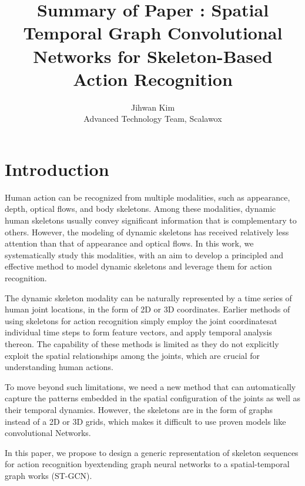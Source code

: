 \documentclass{article}
\begin{document}

\title{Summary of Paper : Spatial Temporal Graph Convolutional Networks for Skeleton-Based Action Recognition} %
\author{Jihwan Kim\\Advanced Technology Team, Scalawox} %

\maketitle

\section{Introduction}
Human action can be recognized from multiple modalities, {\color{red}such as appearance, depth, optical flows, and body skeletons.} Among these modalities, dynamic human skeletons usually convey significant information that is complementary to others. However, the modeling of dynamic skeletons has received relatively less attention than that of appearance and optical flows. In this work, we systematically study this modalities, with an aim to develop a principled and effective method to model dynamic skeletons and leverage them for action recognition.

The dynamic skeleton modality can be naturally represented by a time series of human joint locations, in the form of 2D or 3D coordinates. {\color{red}Earlier methods of using skeletons for action recognition simply employ the joint coordinatesat individual time steps to form feature vectors, and apply temporal analysis thereon.} The capability of these methods is limited as they do not explicitly exploit the spatial relationships among the joints, which are crucial for understanding human actions.

To move beyond such limitations, we need a new method that can automatically capture the patterns embedded in the spatial configuration of the joints as well as their temporal dynamics. However, {\color{red}the skeletons are in the form of graphs instead of a 2D or 3D grids, which makes it difficult to use proven models like convolutional Networks}. 

In this paper, we propose to design a generic representation of skeleton sequences for action recognition byextending graph neural networks to a spatial-temporal graph works (ST-GCN).
\end{document}
